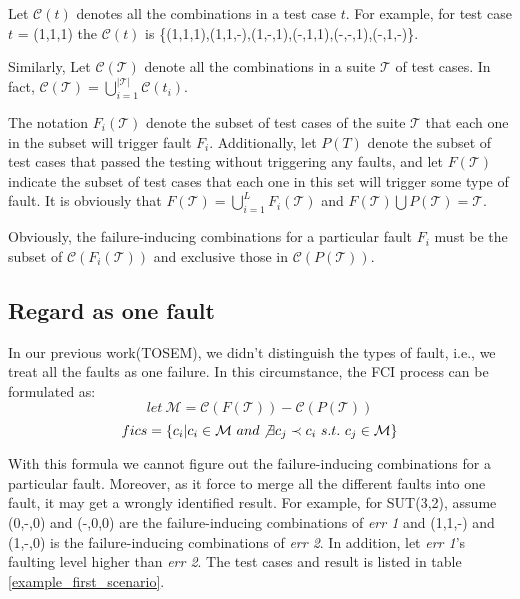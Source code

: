 \documentclass{sig-alternate}
\begin{document}
Let $\mathcal{C}(t)$ denotes all the combinations in a test case $t$. For example, for test case $t$ = (1,1,1) the  $\mathcal{C}(t)$ is \{(1,1,1),(1,1,-),(1,-,1),(-,1,1),(-,-,1),(-,1,-)\}.

Similarly, Let $\mathcal{C}(\mathcal{T})$ denote all the combinations in a suite $\mathcal{T}$ of test cases. In fact, $\mathcal{C}(\mathcal{T}) = \bigcup_{i = 1}^{|\mathcal{T}|}\mathcal{C}(t_{i})$.

The notation $F_{i}(\mathcal{T})$  denote the subset of test cases of the suite $\mathcal{T}$ that each one in the subset will trigger fault $F_{i}$.  Additionally, let $P(T)$ denote the subset of test cases that passed the testing without triggering any faults, and let $F(\mathcal{T})$ indicate the subset of test cases that each one in this set will trigger some type of fault. It is obviously that $F(\mathcal{T}) =  \bigcup_{i = 1}^{L}F_{i}(\mathcal{T})$ and $F(\mathcal{T})\bigcup P(\mathcal{T}) = \mathcal{T}$.

Obviously, the failure-inducing combinations for a particular fault $F_{i}$ must be the subset of $\mathcal{C}(F_{i}(\mathcal{T}))$ and exclusive those in $\mathcal{C}(P(\mathcal{T}))$.

\subsection{Regard as one fault}

In our previous work(TOSEM), we didn't distinguish the types of fault, i.e., we treat all the faults as one failure. In this circumstance, the FCI process can be formulated as:
 $$let\ \mathcal{M} = \mathcal{C}(F(\mathcal{T})) - \mathcal{C}(P(\mathcal{T}))$$
$$fics = \{c_{i} | c_{i} \in \mathcal{M} \ and \not\exists c_{j} \prec c_{i}\ s.t.\ c_{j} \in \mathcal{M} \}$$

With this formula we cannot figure out the failure-inducing combinations for a particular fault. Moreover, as it force to merge all the different faults into one fault, it may get a wrongly identified result. For example, for SUT(3,2), assume (0,-,0) and (-,0,0) are the failure-inducing combinations of \emph{err 1} and (1,1,-) and (1,-,0) is the failure-inducing combinations of \emph{err 2}. In addition, let \emph{err 1}'s faulting level higher than \emph{err 2}. The test cases and result is listed in table \ref{example_first_scenario}.
\end{document}
